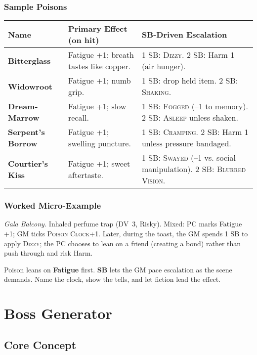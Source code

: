 \subsection*{Sample Poisons}
\begin{tabularx}{\linewidth}{>{\bfseries}l X X}
\toprule
Name & Primary Effect (on hit) & SB-Driven Escalation \\
\midrule
Bitterglass & Fatigue +1; breath tastes like copper. & 1 SB: \textsc{Dizzy}. 2 SB: Harm 1 (air hunger). \\
Widowroot & Fatigue +1; numb grip. & 1 SB: drop held item. 2 SB: \textsc{Shaking}. \\
Dream-Marrow & Fatigue +1; slow recall. & 1 SB: \textsc{Fogged} (–1 to memory). 2 SB: \textsc{Asleep} unless shaken. \\
Serpent’s Borrow & Fatigue +1; swelling puncture. & 1 SB: \textsc{Cramping}. 2 SB: Harm 1 unless pressure bandaged. \\
Courtier’s Kiss & Fatigue +1; sweet aftertaste. & 1 SB: \textsc{Swayed} (–1 vs. social manipulation). 2 SB: \textsc{Blurred Vision}. \\
\bottomrule
\end{tabularx}

\subsection*{Worked Micro-Example}
\emph{Gala Balcony.} Inhaled perfume trap (DV~3, Risky). Mixed: PC marks Fatigue +1; GM ticks \textsc{Poison Clock}+1. Later, during the toast, the GM spends 1 SB to apply \textsc{Dizzy}; the PC chooses to lean on a friend (creating a bond) rather than push through and risk Harm.

\begin{tcolorbox}[title={Summary},colback=gray!5,colframe=black]
\small Poison leans on \textbf{Fatigue} first. \textbf{SB} lets the GM pace escalation as the scene demands. Name the clock, show the tells, and let fiction lead the effect.
\end{tcolorbox}

\chapter{Boss Generator}

\section{Core Concept}

